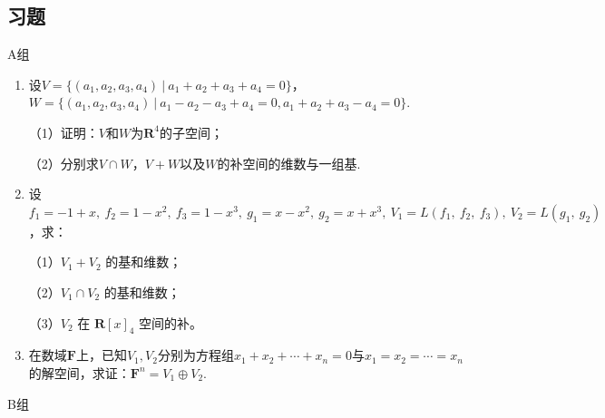 \subsection{习题}
\centerline{\heiti A组}
\begin{enumerate}
	\item 设$V=\{(a_1,a_2,a_3,a_4)\ |\ a_1+a_2+a_3+a_4=0\}$，$W=\{(a_1,a_2,a_3,a_4)\ |\ a_1-a_2-a_3+a_4=0,a_1+a_2+a_3-a_4=0\}$.
	
	（1）证明：$V$和$W$为$\mathbf{R}^4$的子空间；

	（2）分别求$V \cap W$，$V+W$以及$W$的补空间的维数与一组基.
	\item 设 $f_1=-1+x,\ f_2=1-x^2,\ f_3=1-x^3,\ g_1=x-x^2,\ g_2=x+x^3,\ V_1=L\left(f_1,\ f_2,\ f_3\right),\ V_2=L\left(g_1,\ g_2\right)$，求：

	（1）$V_1+V_2$ 的基和维数；

	（2）$V_1 \cap V_2$ 的基和维数；

	（3）$V_2$ 在 $\mathbf{R}[x]_4$ 空间的补。
	\item 在数域$\mathbf{F}$上，已知$V_1,V_2$分别为方程组$x_1+x_2+\cdots+x_n=0$与$x_1=x_2=\cdots=x_n$
	的解空间，求证：$\mathbf{F}^n=V_1\oplus V_2$.
\end{enumerate}
\centerline{\heiti B组}
